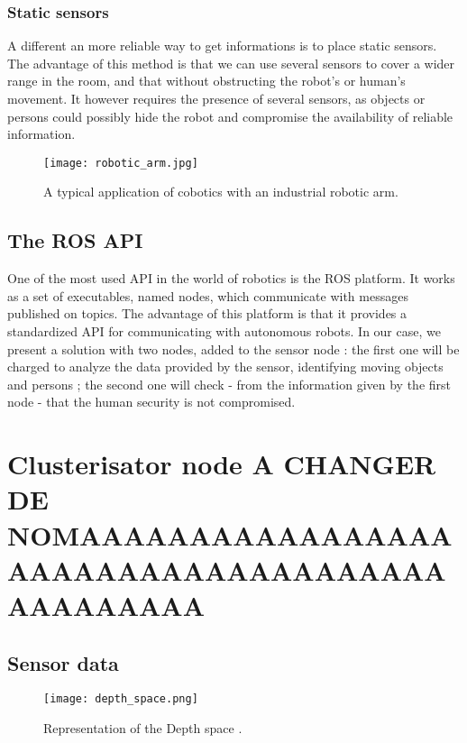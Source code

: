 \documentclass[smallextended]{svjour3}
\begin{document}
\subsubsection{Static sensors}

A different an more reliable way to get informations is to place static sensors. The advantage of this method is that we can use several sensors to cover a wider range in the room, and that without obstructing the robot's or human's movement. It however requires the presence of several sensors, as objects or persons could possibly hide the robot and compromise the availability of reliable information.


\begin{figure}
\centering
\texttt{[image: robotic\_arm.jpg]}
\caption{\label{fig:robotic_arm}A typical application of cobotics with an industrial robotic arm.}
\end{figure}

\subsection{The ROS API}

One of the most used API in the world of robotics is the ROS platform. It works as a set of executables, named nodes, which communicate with messages published on topics. The advantage of this platform is that it provides a standardized API for communicating with autonomous robots. In our case, we present a solution with two nodes, added to the sensor node : the first one will be charged to analyze the data provided by the sensor, identifying moving objects and persons ; the second one will check - from the information given by the first node - that the human security is not compromised.

\section{Clusterisator node A CHANGER DE NOMAAAAAAAAAAAAAAAAAAAAAAAAAAAAAAAAAAAAAAAAAAAAAA}

\subsection{Sensor data}

\begin{figure}
\centering
\texttt{[image: depth\_space.png]}
\caption{\label{fig:depth_space}Representation of the Depth space \cite{Ref1}.}
\end{figure}
\end{document}
